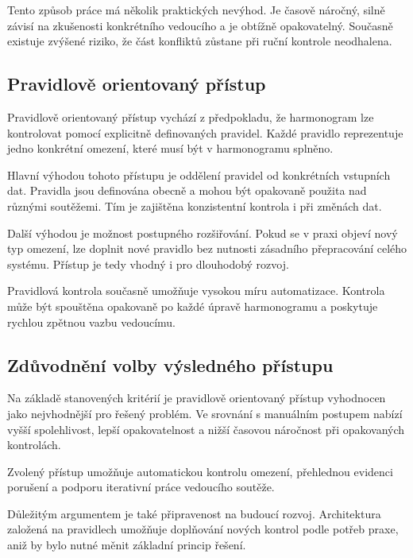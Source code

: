 \documentclass[czech, kiv, ba, he, iso690alph, pdf]{fasthesis}
\begin{document}
				Tento způsob práce má několik praktických nevýhod. Je časově náročný, silně závisí na zkušenosti konkrétního vedoucího a je obtížně opakovatelný. Současně existuje zvýšené riziko, že část konfliktů zůstane při ruční kontrole neodhalena.
	
	

			\subsection{Pravidlově orientovaný přístup}

				Pravidlově orientovaný přístup vychází z předpokladu, že harmonogram lze kontrolovat pomocí explicitně definovaných pravidel. Každé pravidlo reprezentuje jedno konkrétní omezení, které musí být v harmonogramu splněno.
	
				Hlavní výhodou tohoto přístupu je oddělení pravidel od konkrétních vstupních dat. Pravidla jsou definována obecně a mohou být opakovaně použita nad různými soutěžemi. Tím je zajištěna konzistentní kontrola i při změnách dat.
	
				Další výhodou je možnost postupného rozšiřování. Pokud se v praxi objeví nový typ omezení, lze doplnit nové pravidlo bez nutnosti zásadního přepracování celého systému. Přístup je tedy vhodný i pro dlouhodobý rozvoj.
	
				Pravidlová kontrola současně umožňuje vysokou míru automatizace. Kontrola může být spouštěna opakovaně po každé úpravě harmonogramu a poskytuje rychlou zpětnou vazbu vedoucímu.
	
	

			\subsection{Zdůvodnění volby výsledného přístupu}
	
				Na základě stanovených kritérií je pravidlově orientovaný přístup vyhodnocen jako nejvhodnější pro řešený problém. Ve srovnání s manuálním postupem nabízí vyšší spolehlivost, lepší opakovatelnost a nižší časovou náročnost při opakovaných kontrolách.
	
				Zvolený přístup umožňuje automatickou kontrolu omezení, přehlednou evidenci porušení a podporu iterativní práce vedoucího soutěže.
	
				Důležitým argumentem je také připravenost na budoucí rozvoj. Architektura založená na pravidlech umožňuje doplňování nových kontrol podle potřeb praxe, aniž by bylo nutné měnit základní princip řešení.
	
\end{document}
